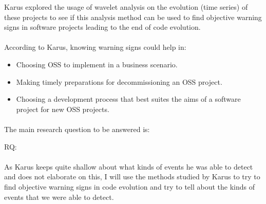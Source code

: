 Karus explored the usage of wavelet analysis on the evolution (time series) of
these projects to see if this analysis method can be used to find objective
warning signs in software projects leading to the end of code evolution.

\paragraph{}
According to Karus, knowing warning signs could help in:
\begin{itemize}
	\item Choosing OSS to implement in a business scenario.
	\item Making timely preparations for decommissioning an OSS project.
	\item Choosing a development process that best suites the aims of a software
	project for new OSS projects.
\end{itemize}

\paragraph{}
The main research question to be answered is:
\begin{description}
	\item[RQ:] \emph{\researchQuestion} \cite{karus2013}
\end{description}

\paragraph{}
As Karus keeps quite shallow about what kinds of events he was able to detect
and does not elaborate on this, I will use the methods studied by Karus to try
to find objective warning signs in code evolution and try to tell about the
kinds of events that we were able to detect.
